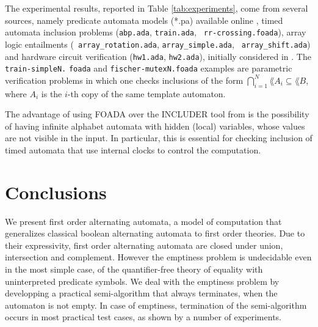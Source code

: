 The experimental results, reported in Table \ref{tab:experiments},
come from several sources, namely predicate automata models (*.pa)
\cite{Farzan15,Farzan16} available online \cite{pa}, timed automata
inclusion problems ({\tt abp.ada}, {\tt train.ada}, {\tt
  rr-crossing.foada}), array logic entailments ({\tt
  array\_rotation.ada}, {\tt array\_simple.ada}, {\tt
  array\_shift.ada}) and hardware circuit verification ({\tt hw1.ada},
{\tt hw2.ada}), initially considered in \cite{IosifRV16}. The {\tt
  train-simpleN.} {\tt foada} and {\tt fischer-mutexN.foada} examples are
parametric verification problems in which one checks inclusions of the
form $\bigcap_{i=1}^N\lang{A_i} \subseteq \lang{B}$, where $A_i$ is
the $i$-th copy of the same template automaton.

The advantage of using FOADA over the INCLUDER \cite{includer} tool
from \cite{IosifRV16} is the possibility of having infinite alphabet
automata with hidden (local) variables, whose values are not visible
in the input. In particular, this is essential for checking inclusion
of timed automata that use internal clocks to control the computation.

\section{Conclusions}

We present first order alternating automata, a model of computation
that generalizes classical boolean alternating automata to first order
theories. Due to their expressivity, first order alternating automata
are closed under union, intersection and complement. However the
emptiness problem is undecidable even in the most simple case, of the
quantifier-free theory of equality with uninterpreted predicate
symbols. We deal with the emptiness problem by developping a practical
semi-algorithm that always terminates, when the automaton is not
empty. In case of emptiness, termination of the semi-algorithm occurs
in most practical test cases, as shown by a number of experiments.
